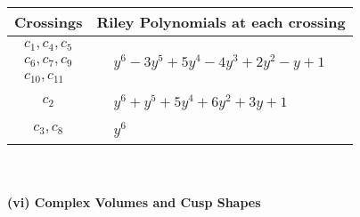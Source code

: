 \documentclass[1p]{elsarticle_modified}
\theoremstyle{definition}
\begin{document}
\begin{tabular}{m{50pt}|m{274pt}}
Crossings & \hspace{64pt}Riley Polynomials at each crossing \\
\hline $$\begin{aligned}c_{1},c_{4},c_{5}\\c_{6},c_{7},c_{9}\\c_{10},c_{11}\end{aligned}$$&$\begin{aligned}
&y^6-3 y^5+5 y^4-4 y^3+2 y^2- y+1
\end{aligned}$\\
\hline $$\begin{aligned}c_{2}\end{aligned}$$&$\begin{aligned}
&y^6+y^5+5 y^4+6 y^2+3 y+1
\end{aligned}$\\
\hline $$\begin{aligned}c_{3},c_{8}\end{aligned}$$&$\begin{aligned}
&y^6
\end{aligned}$\\
\hline
\end{tabular}\\~\\
\newpage\flushleft \textbf{(vi) Complex Volumes and Cusp Shapes}
\end{document}
